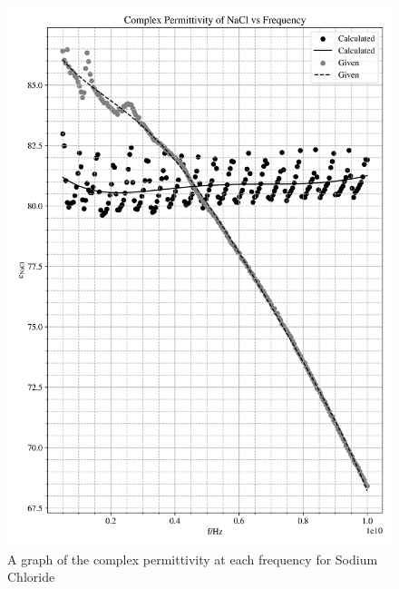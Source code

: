 \documentclass[12pt, a4paper]{article}
\begin{document}
\begin{multicols*}{2}
\begin{figure}[H]
    \centering
    \includegraphics[width = \linewidth]{Plot2.png}\caption{A graph of the complex permittivity at each frequency for Sodium Chloride}\label{fig: NaCl Graph}
\end{figure}

\begin{table}[H]
    \centering
    \caption{A table of four different data points for NaCl}\label{tab: Table 2}
\end{table}


\end{multicols*}
\end{document}
